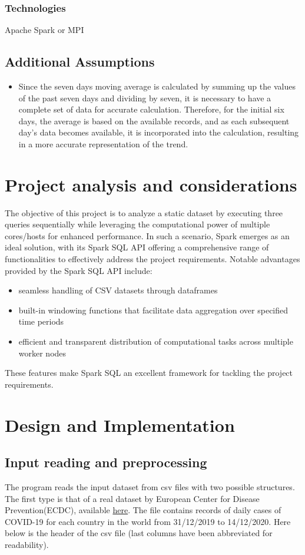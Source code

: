 \documentclass[11pt]{article}
\begin{document}
\subsubsection{Technologies}
Apache Spark or MPI

\subsection{Additional Assumptions}
\begin{itemize}
    \item Since the seven days moving average is calculated by summing up the values of the past seven days and dividing by seven, it is necessary to have a complete set of data for accurate calculation. Therefore, for the initial six days, the average is based on the available records, and as each subsequent day's data becomes available, it is incorporated into the calculation, resulting in a more accurate representation of the trend.
\end{itemize}

\section{Project analysis and considerations}
The objective of this project is to analyze a static dataset by executing three queries sequentially while leveraging the computational power of multiple cores/hosts for enhanced performance. In such a scenario, Spark emerges as an ideal solution, with its Spark SQL API offering a comprehensive range of functionalities to effectively address the project requirements. Notable advantages provided by the Spark SQL API include:
\begin{itemize}
    \item seamless handling of CSV datasets through dataframes
    \item built-in windowing functions that facilitate data aggregation over specified time periods
    \item efficient and transparent distribution of computational tasks across multiple worker nodes
\end{itemize}
These features make Spark SQL an excellent framework for tackling the project requirements.


\section{Design and Implementation}

\subsection{Input reading and preprocessing}
The program reads the input dataset from csv files with two possible structures. 
The first type is that of a real dataset by European Center for Disease Prevention(ECDC), available \href{https://www.ecdc.europa.eu/en/publications-data/download-todays-data-geographic-distribution-covid-19-cases-worldwide}{here}. The file contains records of daily cases of COVID-19 for each country in the world from 31/12/2019 to 14/12/2020. Here below is the header of the csv file (last columns have been abbreviated for readability).
\end{document}
